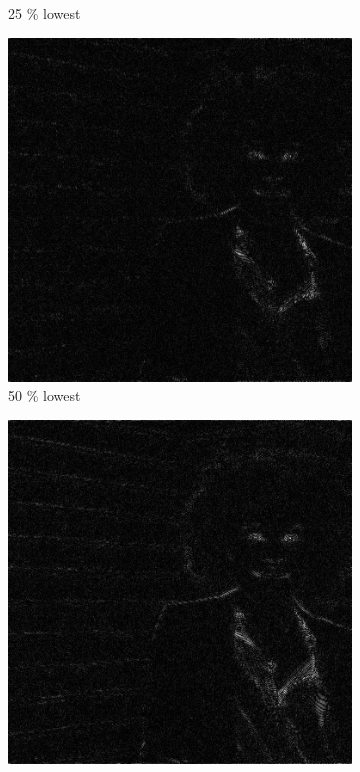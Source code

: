 \begin{figure}[h!]
\begin{subfigure}{0.2\textwidth}
  \caption{25 \% lowest}
\end{subfigure}%
\begin{subfigure}{0.2\textwidth}
  \centering
  \includegraphics[width=0.95\linewidth]{output/magnitud_low_50.jpg}
  \caption{50 \% lowest}
\end{subfigure}%
\begin{subfigure}{0.2\textwidth}
  \centering
  \includegraphics[width=0.95\linewidth]{output/magnitud_low_75.jpg}

\end{subfigure}
\end{figure}
